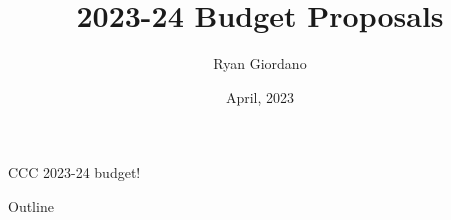 \documentclass[8pt]{beamer}
\title{2023-24 Budget Proposals}
\author{Ryan Giordano}
\date{April, 2023}
\institute{Children's Community Center}
\begin{document}
\def\subitem#1{\begin{itemize}\item #1\end{itemize}}



\begin{frame}{}
    \begin{center}
    {\Large CCC 2023-24 budget!}
\end{center}
\end{frame}

\begin{frame}{Outline}


\end{frame}
\end{document}
